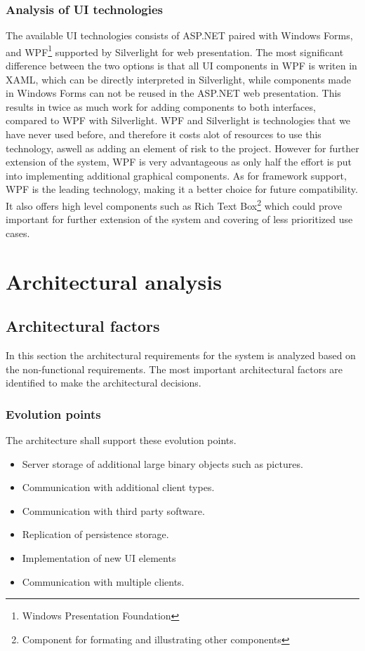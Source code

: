 \documentclass[a4paper,11pt,report]{report}
\begin{document}
		\subsubsection{Analysis of UI technologies}
		The available UI technologies consists of ASP.NET paired with Windows Forms, and WPF\footnote[3]{Windows Presentation Foundation} supported by Silverlight for web presentation. The most significant difference between the two options is that all UI components in WPF is writen in XAML, which can be directly interpreted in Silverlight, while components made in Windows Forms can not be reused in the ASP.NET web presentation. This results in twice as much work for adding components to both interfaces, compared to WPF with Silverlight. WPF and Silverlight is technologies that we have never used before, and therefore it costs alot of resources to use this technology, aswell as adding an element of risk to the project. However for further extension of the system, WPF is very advantageous as only half the effort is put into implementing additional graphical components. As for framework support, WPF is the leading technology, making it a better choice for future compatibility. It also offers high level components such as Rich Text Box\footnote[4]{Component for formating and illustrating other components} which could prove important for further extension of the system and covering of less prioritized use cases.

\section{Architectural analysis}
\subsection{Architectural factors}
In this section the architectural requirements for the system is analyzed based on the non-functional requirements. The most important architectural factors are identified to make the architectural decisions.
\subsubsection{Evolution points}
The architecture shall support these evolution points.
\begin{itemize}
\item Server storage of additional large binary objects such as pictures.
\item Communication with additional client types.
\item Communication with third party software.
\item Replication of persistence storage.
\item Implementation of new UI elements
\item Communication with multiple clients.
\end{itemize}
\end{document}
